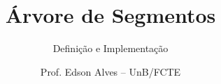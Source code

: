 \title{Árvore de Segmentos}
\subtitle{Definição e Implementação}
\author{Prof. Edson Alves -- UnB/FCTE}
\date{}
